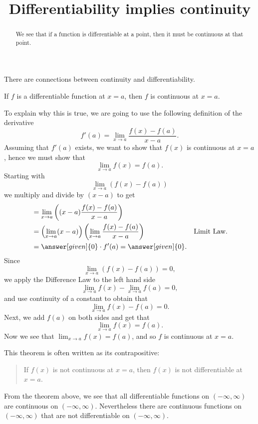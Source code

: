 \documentclass{ximera}
\title[Dig-In:]{Differentiability implies continuity}
\begin{document}
\begin{abstract}
We see that if a function is differentiable at a point, then it must
be continuous at that point.
\end{abstract}
\maketitle

There are connections between continuity and differentiability.

\begin{theorem}
	If $f$ is a differentiable function at $x = a$, then $f$ is continuous
	at $x=a$.
	\begin{explanation}
		To explain why this is true, we are going to use the following
		definition of the derivative
		\[ f'(a) = \lim_{x\to a} \frac{f(x)-f(a)}{x-a}. \]
		 Assuming that $f'(a)$ exists, we want to show that $f(x)$ is
		continuous at $x=a$, hence we must show that
		\[ \lim_{x\to a} f(x) = f(a). \]
		Starting with
		\[ \lim_{x\to a} \left(f(x) - f(a)\right) \]
		we multiply and divide by $(x-a)$ to get
		\begin{align*}
			  &= \lim_{x\to a} \left((x-a)\frac{f(x) - f(a)}{x-a}\right) \\
			  &= \left(\lim_{x\to a} (x-a) \right) \left(\lim_{x\to a}\frac{f(x) - f(a)}{x-a}\right) &\text{Limit Law.} \\
			  &= \answer[given]{0}\cdot f'(a) = \answer[given]{0}.
		\end{align*}
		Since 
		\[ \lim_{x\to a}\left(f(x) - f(a)\right) = 0 , \]
		we apply the Difference Law to the left hand side
		\[ \lim_{x\to a}f(x) - \lim_{x\to a}f(a) = 0 , \]
		and use continuity of a constant to obtain that
		\[ \lim_{x\to a}f(x) - f(a) = 0 . \]
		Next, we add $f(a)$ on both sides and get that
		\[ \lim_{x\to a}f(x) = f(a). \]
		Now we see that $\lim_{x\to a} f(x) = f(a)$, and so $f$ is continuous at $x=a$.
	\end{explanation}
\end{theorem}

This theorem is often written as its contrapositive:
\begin{quote}
	If $f(x)$ is not continuous at $x=a$, then $f(x)$ is not differentiable at $x=a$.
\end{quote}


From the theorem above, we see that all differentiable functions
on $(-\infty, \infty)$ are continuous on $(-\infty, \infty)$. Nevertheless there are continuous
functions on $(-\infty, \infty)$ that are not differentiable on $(-\infty, \infty)$.
\end{document}
